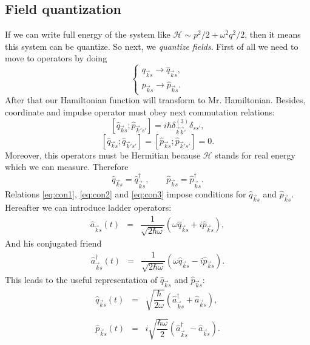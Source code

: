 	\subsection{Field quantization}
	
	If we can write full energy of the system like $\mathscr{H} \sim p^2/2 + \omega^2 q^2/2$, then it means this system can be quantize.  So next, we  \textit{quantize fields}. First of all we need to move to operators by doing
	\begin{equation}
		\begin{cases}
		q_{\vec{k}s} \to \hat{q}_{\vec{k}s}, \\
		p_{\vec{k}s} \to \hat{p}_{\vec{k}s}.
		\end{cases}
	\end{equation}
	After that our Hamiltonian function will transform to Mr. Hamiltonian.
	Besides, coordinate and impulse operator must obey next commutation relations:
	\begin{equation}
		\left[\hat{q}_{\vec{k}s} ; \hat{p}_{\vec{k}'s'} \right] = i \hbar \delta^{(3)}_{\vec{k}\vec{k}'} \delta_{ss'},
		\label{eq:con1}
	\end{equation}
	\begin{equation}
		\left[\hat{q}_{\vec{k}s} ; \hat{q}_{\vec{k}'s'} \right] = \left[\hat{p}_{\vec{k}s} ; \hat{p}_{\vec{k}'s'} \right] = 0.
		\label{eq:con2}
	\end{equation}
	Moreover, this operators must be Hermitian because $\mathscr{H}$ stands for real energy which we can measure. Therefore
	\begin{equation}
		\hat{q}_{\vec{k}s} = \hat{q}^{\dagger}_{\vec{k}s}, \qquad \hat{p}_{\vec{k}s} = \hat{p}^{\dagger}_{\vec{k}s}.
		\label{eq:con3}
	\end{equation}
	Relations \eqref{eq:con1}, \eqref{eq:con2} and \eqref{eq:con3} impose conditions for $\hat{q}_{\vec{k}s}$ and $\hat{p}_{\vec{k}s}$.
	Hereafter we can introduce ladder operators:
	\begin{eqnarray}
		\hat{a}_{\vec{k}s}(t) &=& \dfrac{1}{\sqrt{2 \hbar \omega}} \left( \omega \hat{q}_{\vec{k}s} + i \hat{p}_{\vec{k}s} \right), %
	\end{eqnarray}
	And his conjugated friend
	\begin{eqnarray}
		\hat{a}^{\dagger}_{\vec{k}s}(t) &=& \dfrac{1}{\sqrt{2 \hbar \omega}} \left( \omega \hat{q}_{\vec{k}s} - i \hat{p}_{\vec{k}s} \right).
	\end{eqnarray}
	This leads to the useful representation of $\hat{q}_{\vec{k}s}$ and $\hat{p}_{\vec{k}s}$:
	\begin{eqnarray}
		\hat{q}_{\vec{k}s}(t) &=& \sqrt{\dfrac{\hbar}{2 \omega}} \left( \hat{a}^{\dagger}_{\vec{k}s} +  \hat{a}_{\vec{k}s} \right), \\ \nonumber \\
		\hat{p}_{\vec{k}s}(t) &=& i \sqrt{\dfrac{\hbar \omega}{2}} \left( \hat{a}^{\dagger}_{\vec{k}s} -  \hat{a}_{\vec{k}s} \right).
	\end{eqnarray}
	
